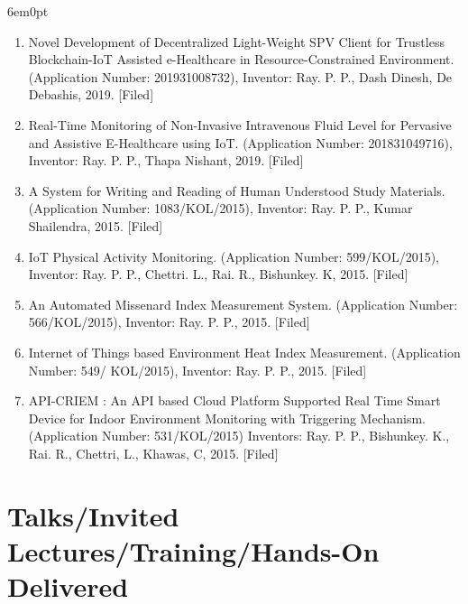 \documentclass[11pt,a4paper]{moderncv}
\begin{document}
\begin{adjustwidth}{6em}{0pt}
	\begin{enumerate}
		
		\item Novel Development of Decentralized Light-Weight SPV Client for Trustless Blockchain-IoT Assisted e-Healthcare in Resource-Constrained Environment. (Application Number: 201931008732), Inventor: Ray. P. P., Dash Dinesh, De Debashis, 2019. [Filed]
		
		\item Real-Time Monitoring of Non-Invasive Intravenous Fluid Level for Pervasive and Assistive E-Healthcare using IoT. (Application Number: 201831049716), Inventor: Ray. P. P., Thapa Nishant, 2019. [Filed]
		
		\item A System for Writing and Reading of Human Understood Study Materials. (Application Number: 1083/KOL/2015), Inventor: Ray. P. P., Kumar Shailendra, 2015. [Filed]
		
		\item IoT Physical Activity Monitoring. (Application Number: 599/KOL/2015), Inventor: Ray. P. P., Chettri. L., Rai. R., Bishunkey. K, 2015. [Filed]
		
		\item An Automated Missenard Index Measurement System. (Application Number: 566/KOL/2015), Inventor: Ray. P. P., 2015. [Filed]
		
		\item Internet of Things based Environment Heat Index Measurement. (Application Number: 549/ KOL/2015), Inventor: Ray. P. P., 2015. [Filed]
		
		\item API-CRIEM : An API based Cloud Platform Supported Real Time Smart Device for Indoor Environment Monitoring with Triggering Mechanism. (Application Number: 531/KOL/2015) Inventors: Ray. P. P., Bishunkey. K., Rai. R., Chettri, L., Khawas, C, 2015. [Filed]
		
		
	\end{enumerate}
\end{adjustwidth}






\section{\textbf{Talks/Invited Lectures/Training/Hands-On Delivered}}
\end{document}

